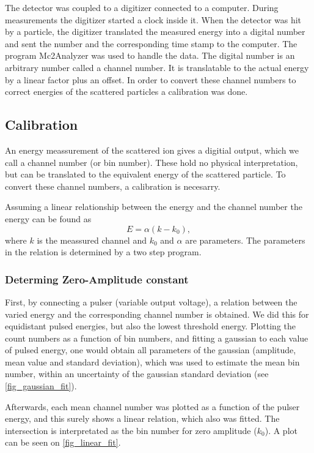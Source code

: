 The detector was coupled to a digitizer connected to a computer. During
measurements the digitizer started a clock inside it. When the detector was hit
by a particle, the digitizer translated the measured energy into a digital
number and sent the number and the corresponding time stamp to the computer.
The program Mc2Analyzer was used to handle the data. The digital number is an
arbitrary number called a channel number. It is translatable to the actual
energy by a linear factor plus an offset. In order to convert these channel
numbers to correct energies of the scattered particles a calibration was done.

\subsection{Calibration}
An energy meassurement of the scattered ion gives a digitial output, which we call
a channel number (or bin number). These hold no physical interpretation, but
can be translated to the equivalent energy of the scattered particle. To
convert these channel numbers, a calibration is necesarry. 

Assuming a linear relationship between the energy and the channel number the
energy can be found as
\begin{equation}
E = \alpha(k - k_0),
\end{equation}
where $k$ is the meassured channel and $k_0$ and $\alpha$ are parameters. The
parameters in the relation is determined by a two step program.

\subsubsection{Determing Zero-Amplitude constant}
First, by connecting a pulser (variable output voltage), a relation between the
varied energy and the corresponding channel number is obtained. 
We did this for equidistant pulsed energies, but also the lowest threshold
energy. Plotting the count numbers as a function of bin numbers, and fitting a
gaussian to each value of pulsed energy, one would obtain all parameters of the
gaussian (amplitude, mean value and standard deviation), which was used to
estimate the mean bin number, within an uncertainty of the gaussian standard deviation (see
\cref{fig_gaussian_fit}). 

Afterwards, each mean channel number was plotted as a function of the pulser
energy, and this surely shows a linear relation, which also was fitted. The
intersection is interpretated as the bin number for zero amplitude ($k_0$). A
plot can be seen on \cref{fig_linear_fit}.

